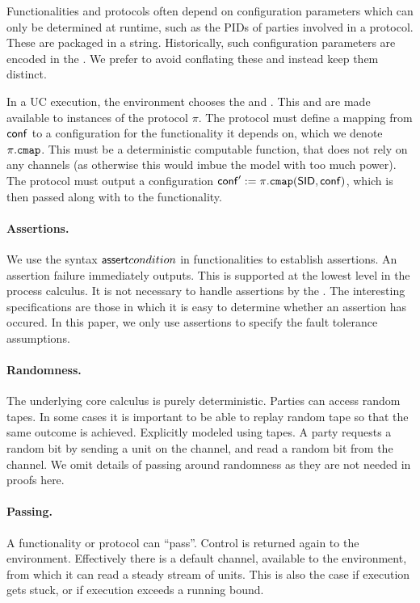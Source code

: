 Functionalities and protocols often depend on configuration parameters which can only be determined at runtime, such as the PIDs of parties involved in a protocol. These are packaged in a  string. Historically, such configuration parameters are encoded in the . We prefer to avoid conflating these and instead keep them distinct.

In a UC execution, the environment chooses the  and . This  and  are made available to instances of the protocol $\pi$. The protocol must define a mapping from ${\mathsf {conf}}$ to a configuration for the functionality it depends on, which we denote $\pi.\mathtt {cmap}$. This must be a deterministic computable function, that does not rely on any channels (as otherwise this would imbue the model with too much power). The protocol must output a configuration ${\mathsf {conf}}' := \pi.\mathtt {cmap}({\mathsf {SID}},{\mathsf {conf}})$, which is then passed along with  to the functionality.

\paragraph{Assertions.}
We use the syntax ${\mathsf {assert}} condition$ in functionalities to establish assertions. An assertion failure immediately outputs. This is supported at the lowest level in the process calculus. It is not necessary to handle assertions by the . The interesting specifications are those in which it is easy to determine whether an assertion has occured. In this paper, we only use assertions to specify the fault tolerance assumptions.

\paragraph{Randomness.}
The underlying core calculus is purely deterministic. Parties can access random tapes. In some cases it is important to be able to replay random tape so that the same outcome is achieved. Explicitly modeled using tapes. A party requests a random bit by sending a unit on the channel, and read a random bit from the channel. We omit details of passing around randomness as they are not needed in proofs here.



\paragraph{Passing.}
A functionality or protocol can ``pass''. Control is returned again to the environment. Effectively there is a default channel, available to the environment, from which it can read a steady stream of units. This is also the case if execution gets stuck, or if execution exceeds a running bound.

